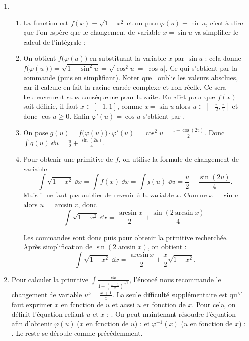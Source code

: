 \documentclass[class=report,crop=false]{standalone}
\begin{document}
\begin{enumerate}
  \item 
  \begin{enumerate}
    \item La fonction est $f(x) = \sqrt{1-x^2}$ et 
    on pose $\varphi(u) = \sin u$, c'est-à-dire que l'on 
    espère que le changement de variable $x = \sin u$ va simplifier le calcul de l'intégrale :
    
    \centerline{ \qquad {}}
    
    \item 
    On obtient $f\big( \varphi(u) \big)$ en substituant la variable $x$ par $\sin u$ :
    cela donne $f\big( \varphi(u) \big) = \sqrt{1-\sin^2 u} = \sqrt{\cos^2 u} = |\cos u|$.
    Ce qui s'obtient par la commande  (puis en simplifiant).    
    Noter que \Sage\ \og oublie \fg{} les valeurs absolues, car il calcule en fait la 
    racine carrée complexe et non réelle.
    Ce sera heureusement sans conséquence pour la suite.
    En effet pour que $f(x)$ soit définie, il faut $x \in [-1,1]$, comme $x = \sin u$
    alors $u \in [-\frac\pi2,\frac\pi2]$ et donc $\cos u \ge 0$.    
    Enfin $\varphi'(u) = \cos u$ s'obtient par .
    
    \item On pose $g(u) = f\big(\varphi(u)\big)\cdot\varphi'(u) = \cos^2 u = \frac{1+\cos(2u)}{2}$.
    Donc $\int g(u)\; \dd u = \frac{u}{2} + \frac{\sin(2u)}{4}$.
    
    \item Pour obtenir une primitive de $f$, on utilise la formule de changement de variable :
    $$\int \sqrt{1-x^2} \; \dd x = \int f(x)\; \dd x = \int g(u) \; \dd u =  \frac{u}{2} + \frac{\sin(2u)}{4}.$$
    Mais il ne faut pas oublier de revenir à la variable $x$. 
    Comme $x = \sin u$ alors $u = \arcsin x$, donc 
    $$\int \sqrt{1-x^2} \; \dd x = \frac{\arcsin x}{2} + \frac{\sin(2\arcsin x)}{4}.$$
    
    Les commandes sont donc  puis
     pour obtenir la primitive recherchée.
    Après simplification de $\sin(2\arcsin x)$, on obtient :
    $$\int \sqrt{1-x^2} \; \dd x = \frac{\arcsin x}{2} + \frac x2 \sqrt{1-x^2}.$$
    
  \end{enumerate}
  
  \item Pour calculer la primitive $\int \frac{\dd x}{1+\left(\frac{x+1}{x}\right)^{1/3}}$, l'énoncé
    nous recommande le changement de variable $u^3 = \frac{x+1}{x}$.
  La seule difficulté supplémentaire est qu'il faut exprimer $x$ en fonction de $u$
  et aussi $u$ en fonction de $x$.
  Pour cela, on définit l'équation  reliant $u$ et $x$ : 
  . On peut maintenant résoudre l'équation afin d'obtenir
  $\varphi(u)$ ($x$ en fonction de $u$) :   et $\varphi^{-1}(x)$ ($u$ en fonction de $x$) : .
  Le reste se déroule comme précédemment.
 

\end{enumerate}
\end{document}
